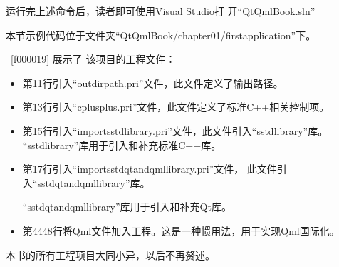 运行完上述命令后，读者即可使用Visual Studio打
开“QtQmlBook.sln”

本节示例代码位于文件夹“QtQmlBook/chapter01/firstapplication”下。

\lstlistingname\ \ref{f000019}
展示了
该项目的工程文件：

\begin{itemize}
\item 第11行引入“outdirpath.pri”文件，此文件定义了输出路径。
\item 第13行引入“cplusplus.pri”文件，此文件定义了标准C{\sourcefonttwo{}+}{\sourcefonttwo{}+}相关控制项。
\item 第15行引入“import\underline{\hspace{0.5em}}sstd\underline{\hspace{0.5em}}library.pri”文件，此文件引入“sstd\underline{\hspace{0.5em}}library”库。
“sstd\underline{\hspace{0.5em}}library”库用于引入和补充标准C{\sourcefonttwo{}+}{\sourcefonttwo{}+}库。
\item 第17行引入“import\underline{\hspace{0.5em}}sstd\underline{\hspace{0.5em}}qt\underline{\hspace{0.5em}}and\underline{\hspace{0.5em}}qml\underline{\hspace{0.5em}}library.pri”文件，
此文件引入“sstd\underline{\hspace{0.5em}}\-qt\underline{\hspace{0.5em}}\-and\underline{\hspace{0.5em}}\-qml\underline{\hspace{0.5em}}\-library”库。

“sstd\underline{\hspace{0.5em}}qt\underline{\hspace{0.5em}}and\underline{\hspace{0.5em}}qml\underline{\hspace{0.5em}}library”库用于引入和补充Qt库。
\item 第44\raisebox{0.16ex}{\sourcefonttwo\~{}}48行将Qml文件加入工程。这是一种惯用法，用于实现Qml国际化。
\end{itemize}

本书的所有工程项目大同小异，以后不再赘述。

